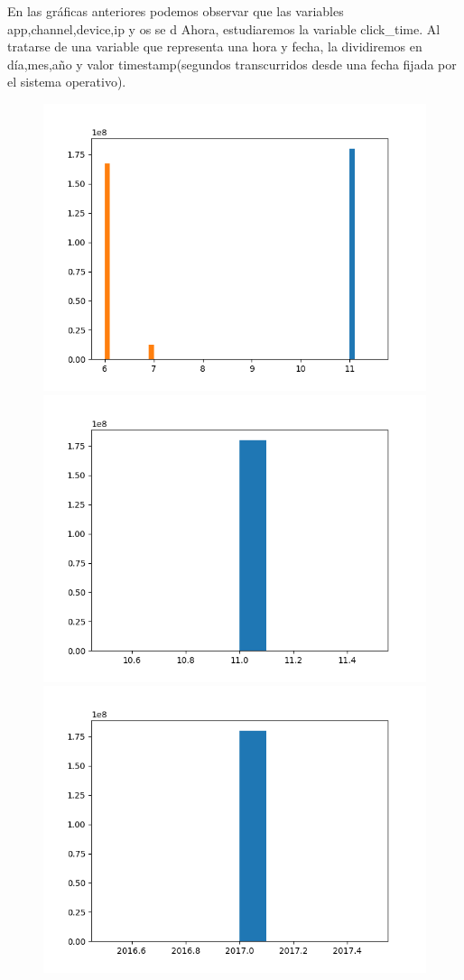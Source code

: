 En las gráficas anteriores podemos observar que las variables app,channel,device,ip y os se d
\medskip
Ahora, estudiaremos la variable click\_time. Al tratarse de una variable que representa una hora y fecha, la dividiremos en día,mes,año y valor timestamp(segundos transcurridos desde una fecha fijada por el sistema operativo).
\begin{figure}
\includegraphics[scale=0.5]{img/click_time_day_distribution.png}
\includegraphics[scale=0.5]{img/click_time_month_distribution.png}
\includegraphics[scale=0.5]{img/click_time_year_distribution.png}

\end{figure}
